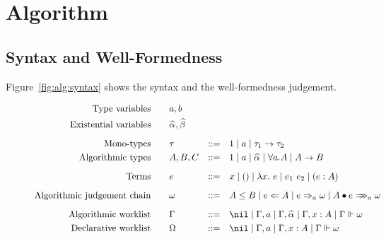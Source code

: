 \section{Algorithm}

\subsection{Syntax and Well-Formedness}

Figure~\ref{fig:alg:syntax} shows the
syntax and the well-formedness judgement.

\begin{figure}
\begin{gather*}
\begin{aligned}
\text{Type variables}\qquad&a, b\\
\text{Existential variables}\qquad&\al, \bt
\\[2mm]
\text{Mono-types}\qquad&\tau &::=&\quad 1 \mid a \mid \tau_1\to \tau_2\\
\text{Algorithmic types}\qquad&A, B, C &::=&\quad 1 \mid a \mid \al \mid \forall a. A \mid A\to B
\\[2mm]
\text{Terms}\qquad&e&::=&\quad x \mid () \mid \lam{e} \mid e_1~e_2 \mid (e:A)
\\[2mm]
\text{Algorithmic judgement chain}\qquad&\jg &::=&\quad A \le B \mid e\Lto A \mid e\To_{a} \jg \mid \appInfAlg{A}{e}
\\[2mm]
\text{Algorithmic worklist}\qquad&\Gm &::=&\quad \nil \mid \Gm, a \mid \Gm, \al \mid \Gm, x: A \mid \Gm \Vdash \jg\\
\text{Declarative worklist}\qquad&\Om &::=&\quad \nil \mid \Gm, a \mid \Gm, x: A \mid \Gm \Vdash \jg
\end{aligned}
\end{gather*}


\end{figure}
